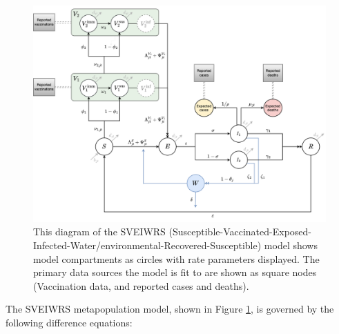\documentclass[
]{book}
\begin{document}
\begin{figure}

{\centering \includegraphics[width=1\linewidth]{diagrams/v_0_5.drawio} 

}

\caption{This diagram of the SVEIWRS (Susceptible-Vaccinated-Exposed-Infected-Water/environmental-Recovered-Susceptible) model shows model compartments as circles with rate parameters displayed. The primary data sources the model is fit to are shown as square nodes (Vaccination data, and reported cases and deaths).}\label{fig:diagram}
\end{figure}

The SVEIWRS metapopulation model, shown in Figure \ref{fig:diagram}, is governed by the following difference equations:
\end{document}
